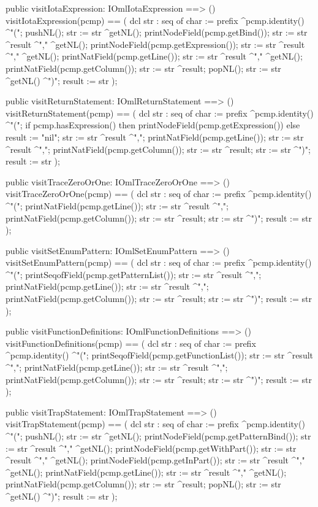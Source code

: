 \begin{vdm_al}
  public visitIotaExpression: IOmlIotaExpression ==> ()
  visitIotaExpression(pcmp) ==
    ( dcl str : seq of char := prefix ^pcmp.identity() ^"(";
      pushNL();
      str := str ^getNL();
      printNodeField(pcmp.getBind());
      str := str ^result ^"," ^getNL();
      printNodeField(pcmp.getExpression());
      str := str ^result ^"," ^getNL();
      printNatField(pcmp.getLine());
      str := str ^result ^"," ^getNL();
      printNatField(pcmp.getColumn());
      str := str ^result;
      popNL();
      str := str ^getNL() ^")";
      result := str );

  public visitReturnStatement: IOmlReturnStatement ==> ()
  visitReturnStatement(pcmp) ==
    ( dcl str : seq of char := prefix ^pcmp.identity() ^"(";
      if pcmp.hasExpression()
      then printNodeField(pcmp.getExpression())
      else result := "nil";
      str := str ^result ^",";
      printNatField(pcmp.getLine());
      str := str ^result ^",";
      printNatField(pcmp.getColumn());
      str := str ^result;
      str := str ^")";
      result := str );

  public visitTraceZeroOrOne: IOmlTraceZeroOrOne ==> ()
  visitTraceZeroOrOne(pcmp) ==
    ( dcl str : seq of char := prefix ^pcmp.identity() ^"(";
      printNatField(pcmp.getLine());
      str := str ^result ^",";
      printNatField(pcmp.getColumn());
      str := str ^result;
      str := str ^")";
      result := str );

  public visitSetEnumPattern: IOmlSetEnumPattern ==> ()
  visitSetEnumPattern(pcmp) ==
    ( dcl str : seq of char := prefix ^pcmp.identity() ^"(";
      printSeqofField(pcmp.getPatternList());
      str := str ^result ^",";
      printNatField(pcmp.getLine());
      str := str ^result ^",";
      printNatField(pcmp.getColumn());
      str := str ^result;
      str := str ^")";
      result := str );

  public visitFunctionDefinitions: IOmlFunctionDefinitions ==> ()
  visitFunctionDefinitions(pcmp) ==
    ( dcl str : seq of char := prefix ^pcmp.identity() ^"(";
      printSeqofField(pcmp.getFunctionList());
      str := str ^result ^",";
      printNatField(pcmp.getLine());
      str := str ^result ^",";
      printNatField(pcmp.getColumn());
      str := str ^result;
      str := str ^")";
      result := str );

  public visitTrapStatement: IOmlTrapStatement ==> ()
  visitTrapStatement(pcmp) ==
    ( dcl str : seq of char := prefix ^pcmp.identity() ^"(";
      pushNL();
      str := str ^getNL();
      printNodeField(pcmp.getPatternBind());
      str := str ^result ^"," ^getNL();
      printNodeField(pcmp.getWithPart());
      str := str ^result ^"," ^getNL();
      printNodeField(pcmp.getInPart());
      str := str ^result ^"," ^getNL();
      printNatField(pcmp.getLine());
      str := str ^result ^"," ^getNL();
      printNatField(pcmp.getColumn());
      str := str ^result;
      popNL();
      str := str ^getNL() ^")";
      result := str );


\end{vdm_al}
